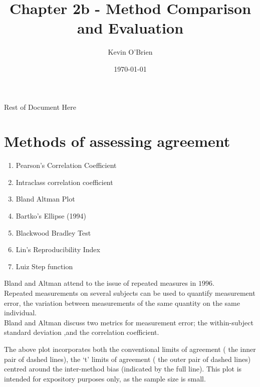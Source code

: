 \documentclass[12pt, a4paper]{report}
\begin{document}
\author{Kevin O'Brien}
\title{Chapter 2b - Method Comparison and Evaluation}
\date{\today}
\maketitle

\tableofcontents \setcounter{tocdepth}{2}






\newpage
Rest of Document Here

\section{Methods of assessing agreement}

\begin{enumerate}
\item Pearson's Correlation Coefficient\item Intraclass
correlation coefficient \item Bland Altman Plot \item Bartko's
Ellipse (1994) \item Blackwood Bradley Test \item Lin's
Reproducibility Index \item Luiz Step function
\end{enumerate}

Bland and Altman attend to the issue of repeated measures in
$1996$.
\\
Repeated measurements on several subjects can be used to quantify
measurement error, the variation between measurements of the same
quantity on the same individual.
\\
Bland and Altman discuss two metrics for measurement error; the
within-subject standard deviation ,and the correlation
coefficient.

The above plot incorporates both the conventional limits of
agreement ( the inner pair of dashed lines), the `t' limits of
agreement ( the outer pair of dashed lines) centred around the
inter-method bias (indicated by the full line). This plot is
intended for expository purposes only, as the sample size is
small.
\end{document}
